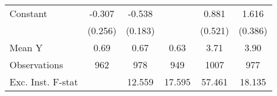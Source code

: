 {\begin{tabular}{l*{5}{c}}
\addlinespace
Constant            &      -0.307         &      -0.538\sym{***}&                     &       0.881\sym{*}  &       1.616\sym{***}\\
                    &     (0.256)         &     (0.183)         &                     &     (0.521)         &     (0.386)         \\
\midrule
Mean Y              &        0.69         &        0.67         &        0.63         &        3.71         &        3.90         \\
Observations        &         962         &         978         &         949         &        1007         &         977         \\
Exc. Inst. F-stat   &                     &      12.559         &      17.595         &      57.461         &      18.135         \\
\bottomrule
\end{tabular}
}
